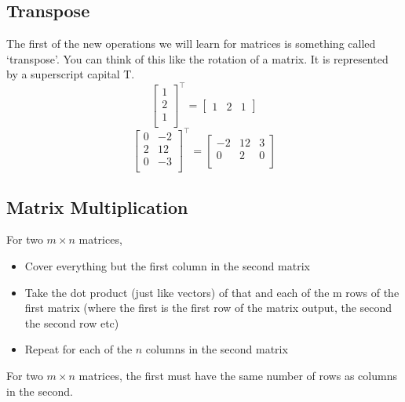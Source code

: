 \documentclass[12pt] {article}
\begin{document}
\subsection*{Transpose}
The first of the new operations we will learn for matrices is something called `transpose'.
You can think of this like the rotation of a matrix. It is represented by a superscript capital T.
\begin{equation*}
  \begin{bmatrix} 
    1 \\
    2 \\
    1 \\
  \end{bmatrix} 
  ^\intercal
  =
  \begin{bmatrix}
    1 & 2 & 1 
  \end{bmatrix}
\end{equation*}
\begin{equation*}
  \begin{bmatrix} 
    0 & -2 \\
    2 & 12 \\
    0 & -3 \\
  \end{bmatrix} 
  ^\intercal
  =
  \begin{bmatrix} 
    -2 & 12 & 3 \\
     0 & 2 & 0 \\
  \end{bmatrix} 
\end{equation*}

\subsection*{Matrix Multiplication}
For two $m \times n$ matrices, 
\begin{itemize}
  \item Cover everything but the first column in the second matrix
  \item Take the dot product (just like vectors) of that and each of the m rows of the first matrix (where the first is the first row of the matrix output, the second the second row etc)
  \item Repeat for each of the $n$ columns in the second matrix
\end{itemize}
For two $m \times n$ matrices, the first must have the same number of rows as columns in the
second. 
\end{document}
